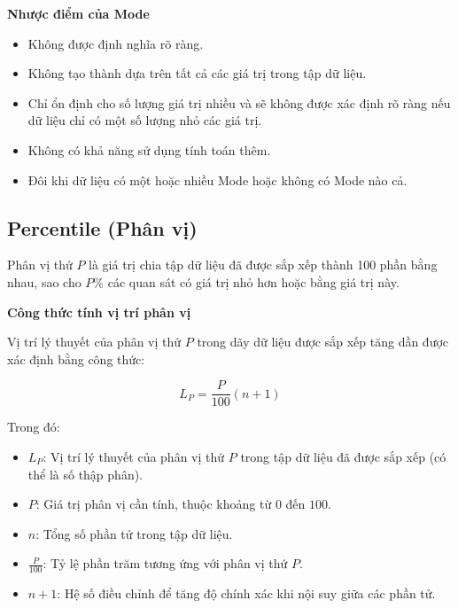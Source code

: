 \textbf{Nhược điểm của Mode}
\begin{itemize}[noitemsep, topsep=0pt]
    \item Không được định nghĩa rõ ràng.

    \item Không tạo thành dựa trên tất cả các giá trị trong tập dữ liệu.

    \item Chỉ ổn định cho số lượng giá trị nhiều và sẽ không được xác định rõ ràng nếu dữ liệu chỉ có một số lượng nhỏ các giá trị.

    \item Không có khả năng sử dụng tính toán thêm.

    \item Đôi khi dữ liệu có một hoặc nhiều Mode hoặc không có Mode nào cả.
\end{itemize}

\subsection {Percentile (Phân vị)}
\label{stat:percentile}

Phân vị thứ \( P \) là giá trị chia tập dữ liệu đã được sắp xếp thành 100 phần bằng nhau, sao cho \( P\% \) các quan sát có giá trị nhỏ hơn hoặc bằng giá trị này.

\textbf{Công thức tính vị trí phân vị}

Vị trí lý thuyết của phân vị thứ \( P \) trong dãy dữ liệu được sắp xếp tăng dần được xác định bằng công thức:

\begin{equation}
    L_P = \frac{P}{100}(n + 1)
    \label{eq:percentile-position}
\end{equation}

\noindent
Trong đó:

\begin{itemize}
    \item \( L_P \): Vị trí lý thuyết của phân vị thứ \( P \) trong tập dữ liệu đã được sắp xếp (có thể là số thập phân).
    \item \( P \): Giá trị phân vị cần tính, thuộc khoảng từ \( 0 \) đến \( 100 \).
    \item \( n \): Tổng số phần tử trong tập dữ liệu.
    \item \( \frac{P}{100} \): Tỷ lệ phần trăm tương ứng với phân vị thứ \( P \).
    \item \( n + 1 \): Hệ số điều chỉnh để tăng độ chính xác khi nội suy giữa các phần tử.
\end{itemize}

